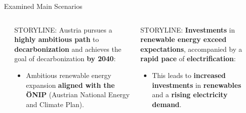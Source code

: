 \documentclass[aspectratio=169]{beamer}
\begin{document}
\begin{frame}{Examined Main Scenarios}
\begin{columns}
\begin{column}{0.32\textwidth}
\begin{coloredblock}
\begin{minipage}[t][4.2cm]{0.9\textwidth}
\begin{itemize}
                    \end{itemize}
                \end{minipage}
            \end{coloredblock}
        \end{column}
        \begin{column}{0.32\textwidth}
            \begin{coloredblock}
                \begin{minipage}[t][5cm]{0.9\textwidth} 
                    \scriptsize STORYLINE: Austria pursues a \textbf{highly ambitious path} to \textbf{decarbonization} and achieves the goal of decarbonization \textbf{by 2040}:
                \end{minipage}
                \begin{minipage}[t][4.2cm]{0.9\textwidth}
                    \begin{itemize}
                        \item \scriptsize Ambitious renewable energy expansion \textbf{aligned with the ÖNIP} (Austrian National Energy and Climate Plan).
                    \end{itemize}
                \end{minipage}
            \end{coloredblock}
        \end{column}
        \begin{column}{0.32\textwidth}
            \begin{coloredblock}
                \begin{minipage}[t][5cm]{0.9\textwidth} 
                    \scriptsize STORYLINE: \textbf{Investments} in \textbf{renewable energy exceed expectations}, accompanied by a \textbf{rapid pace} of \textbf{electrification}:
                \end{minipage}
                \begin{minipage}[t][4.2cm]{0.9\textwidth}
                    \begin{itemize}
                        \item \scriptsize This leads to \textbf{increased investments} in \textbf{renewables} and a \textbf{rising electricity demand}.
                    \end{itemize}
                \end{minipage}
            \end{coloredblock}
        \end{column}
    \end{columns}


\end{frame}
\end{document}
